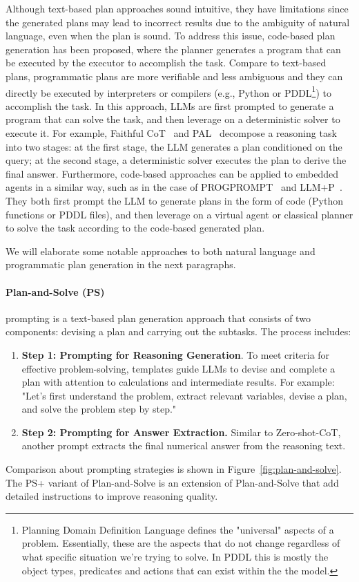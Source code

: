 Although text-based plan approaches sound intuitive, they have limitations since the generated plans may lead to incorrect results due to the ambiguity of natural language, even when the plan is sound.
To address this issue, code-based plan generation has been proposed, where the planner generates a program that can be executed by the executor to accomplish the task.
Compare to text-based plans, programmatic plans are more verifiable and less ambiguous and they can directly be executed by interpreters or compilers (e.g., Python or PDDL\footnote{Planning Domain Definition Language defines the "universal" aspects of a problem. Essentially, these are the aspects that do not change regardless of what specific situation we’re trying to solve. In PDDL this is mostly the object types, predicates and actions that can exist within the the model.}) to accomplish the task.
In this approach, LLMs are first prompted to generate a program that can solve the task, and then leverage on a deterministic solver to execute it.
For example, Faithful CoT~\cite{lyu2023faithful} and PAL~\cite{gao2022pal} decompose a reasoning task into two stages: at the first stage, the LLM generates a plan conditioned on the query; at the second stage, a deterministic solver executes the plan to derive the final answer.
Furthermore, code-based approaches can be applied to embedded agents in a similar way, such as in the case of PROGPROMPT~\cite{singh2022progprompt} and LLM+P~\cite{liu2023llmp}.
They both first prompt the LLM to generate plans in the form of code (Python functions or PDDL files), and then leverage on a virtual agent or classical planner to solve the task according to the code-based generated plan.

We will elaborate some notable approaches to both natural language and programmatic plan generation in the next paragraphs.

\paragraph{Plan-and-Solve (PS)}
\label{par:plan-and-solve}

prompting is a text-based plan generation approach that consists of two components: devising a plan and carrying out the subtasks.
The process includes:
\begin{enumerate}
	\item \textbf{Step 1: Prompting for Reasoning Generation}. To meet criteria for effective problem-solving, templates guide LLMs to devise and complete a plan with attention to calculations and intermediate results. For example: "Let's first understand the problem, extract relevant variables, devise a plan, and solve the problem step by step."
	\item \textbf{Step 2: Prompting for Answer Extraction.} Similar to Zero-shot-CoT, another prompt extracts the final numerical answer from the reasoning text.
\end{enumerate}
Comparison about prompting strategies is shown in Figure~\ref{fig:plan-and-solve}.
The PS+ variant of Plan-and-Solve is an extension of Plan-and-Solve that add detailed instructions to improve reasoning quality.

